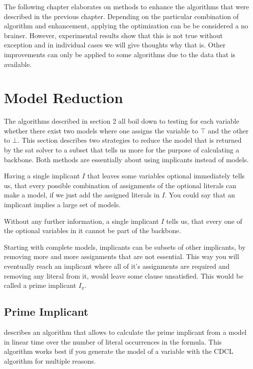 
The following chapter elaborates on methods to enhance the algorithms that were described in the previous chapter. Depending on the particular combination of algorithm and enhancement, applying the optimization can be be considered a no brainer. However, experimental results show that this is not true without exception and in individual cases we will give thoughts why that is. Other improvements can only be applied to some algorithms due to the data that is available.

\section{Model Reduction}

The algorithms described in section 2 all boil down to testing for each variable whether there exist two models where one assigns the variable to $\top$ and the other to $\bot$. This section describes two strategies to reduce the model that is returned by the sat solver to a subset that tells us more for the purpose of calculating a backbone. Both methods are essentially about using implicants instead of models.

Having a single implicant $I$ that leaves some variables optional immediately tells us, that every possible combination of assignments of the optional literals can make a model, if we just add the assigned literals in $I$. You could say that an implicant implies a large set of models.

Without any further information, a single implicant $I$ tells us, that every one of the optional variables in it cannot be part of the backbone.

Starting with complete models, implicants can be subsets of other implicants, by removing more and more assignments that are not essential. This way you will eventually reach an implicant where all of it's assignments are required and removing any literal from it, would leave some clause unsatisfied. This would be called a prime implicant $I_\pi$.

\subsection{Prime Implicant}
\label{ss:primeImplicant}
\cite{dflbm13} describes an algorithm that allows to calculate the prime implicant from a model in linear time over the number of literal occurrences in the formula. This algorithm works best if you generate the model of a variable with the CDCL algorithm for multiple reasons.

